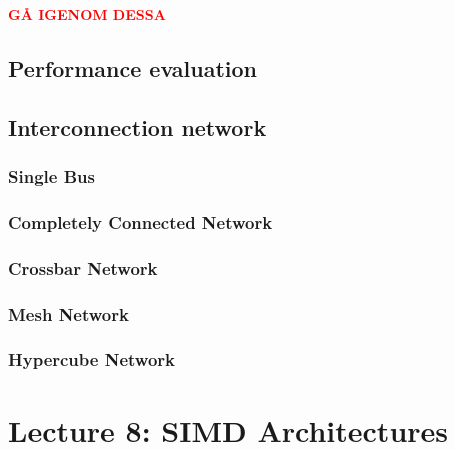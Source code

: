 \documentclass[titlepage, a4paper]{article}
\newcommand{\todo}[1] {\textbf{\textcolor{red}{#1}}}
\begin{document}
\todo{GÅ IGENOM DESSA}\\

\subsection{Performance evaluation}

\subsection{Interconnection network}
\subsubsection{Single Bus}
\subsubsection{Completely Connected Network}
\subsubsection{Crossbar Network}
\subsubsection{Mesh Network}
\subsubsection{Hypercube Network}

\section{Lecture 8: SIMD Architectures}
\end{document}
